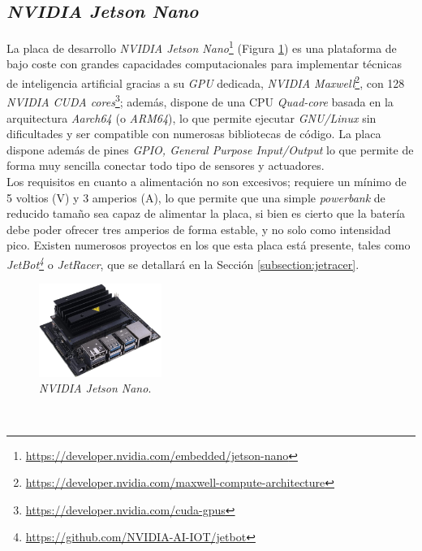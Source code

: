 \subsection{\textit{NVIDIA Jetson Nano}}
\label{subsection:jetsonnano}
La placa de desarrollo \textit{NVIDIA Jetson Nano}\footnote{\url{https://developer.nvidia.com/embedded/jetson-nano}} (Figura \ref{fig:jetsonnano}) es una plataforma de bajo coste con grandes capacidades computacionales para implementar técnicas de inteligencia artificial gracias a su \textit{GPU} dedicada, \textit{NVIDIA Maxwell}\footnote{\url{https://developer.nvidia.com/maxwell-compute-architecture}}, con 128 \textit{NVIDIA CUDA cores}\footnote{\url{https://developer.nvidia.com/cuda-gpus}}; además, dispone de una CPU \textit{Quad-core} basada en la arquitectura \textit{Aarch64} (o \textit{ARM64}), lo que permite ejecutar \textit{GNU/Linux} sin dificultades y ser compatible con numerosas bibliotecas de código. La placa dispone además de pines \textit{GPIO, General Purpose Input/Output} lo que permite de forma muy sencilla conectar todo tipo de sensores y actuadores.\\

Los requisitos en cuanto a alimentación no son excesivos; requiere un mínimo de 5 voltios (V) y 3 amperios (A), lo que permite que una simple \textit{powerbank} de reducido tamaño sea capaz de alimentar la placa, si bien es cierto que la batería debe poder ofrecer tres amperios de forma estable, y no solo como intensidad pico. Existen numerosos proyectos en los que esta placa está presente, tales como \textit{JetBot\footnote{\url{https://github.com/NVIDIA-AI-IOT/jetbot}}} o \textit{JetRacer}, que se detallará en la Sección \ref{subsection:jetracer}.\\

\begin{figure} [h!]
	\begin{center}
		\includegraphics[width=4cm]{figs/jetsonnano}
	\end{center}
	\caption{\textit{NVIDIA Jetson Nano}.}
	\label{fig:jetsonnano}
\end{figure}\

